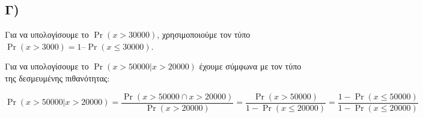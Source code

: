\documentclass{article}
\begin{document}
\subsection*{Γ)}

Για να υπολογίσουμε το $\Pr{(x > 30000)}$, χρησιμοποιούμε τον τύπο $\Pr{(x > 3000)} = 1 –   \Pr{(x \leq 30000)}$. 

Για να υπολογίσουμε το $\Pr{(x > 50000 | x > 20000)}$ έχουμε σύμφωνα με τον τύπο της δεσμευμένης πιθανότητας:

\begin{equation*}
    \Pr{(x > 50000 | x > 20000)} = \frac{\Pr{(x > 50000 \cap x > 20000)}}{\Pr{(x > 20000)}} = \frac{\Pr{(x > 50000)}}{1 - \Pr{(x \leq 20000)}} = \frac{1 - \Pr{(x \leq 50000)}}{1 - \Pr(x \leq 20000)}
\end{equation*}
\end{document}
